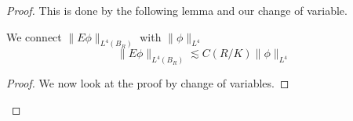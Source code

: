 \begin{proof}
    This is done by the following lemma and our change of variable.
    \begin{lemma}
        We connect $\|E\phi\|_{L^4
        (B_R)}$ with $\|\phi\|_{L^4}$
        \begin{equation*}
            \|E\phi\|_{L^4(B_R)}\lesssim C(R/K)\|\phi\|_{L^4}
        \end{equation*}
    \end{lemma}
    \begin{proof}
        We now look at the proof by change of variables. 
    \end{proof}




\end{proof}